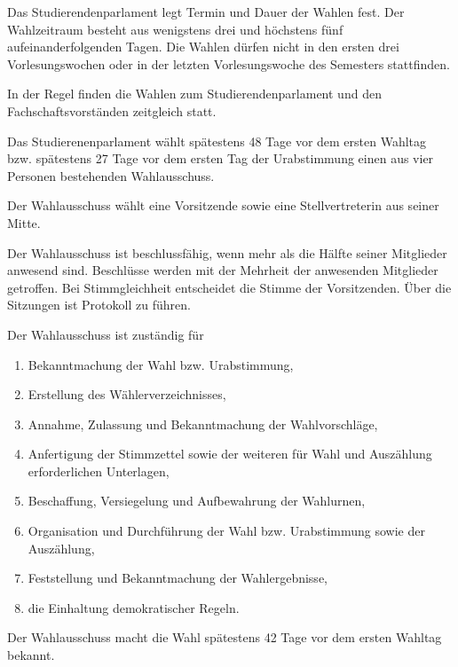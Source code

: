 Das Studierendenparlament legt Termin und Dauer der Wahlen fest. Der Wahlzeitraum besteht aus wenigstens drei und höchstens fünf aufeinanderfolgenden Tagen. Die Wahlen dürfen nicht in den ersten drei Vorlesungswochen oder in der letzten Vorlesungswoche des Semesters stattfinden. 

In der Regel finden die Wahlen zum Studierendenparlament und den Fachschaftsvorständen zeitgleich statt.

\label{wahl:wahlausschuss}
Das Studierenenparlament wählt spätestens 48 Tage vor dem ersten Wahltag bzw. spätestens 27 Tage vor dem ersten Tag der Urabstimmung einen aus vier Personen bestehenden Wahlausschuss. 

Der Wahlausschuss wählt eine Vorsitzende sowie eine Stellvertreterin aus seiner Mitte.

Der Wahlausschuss ist beschlussfähig, wenn mehr als die Hälfte seiner Mitglieder anwesend sind. Beschlüsse werden mit der Mehrheit der anwesenden Mitglieder getroffen. Bei Stimmgleichheit entscheidet die Stimme der Vorsitzenden. Über die Sitzungen ist Protokoll zu führen.

Der Wahlausschuss ist zuständig für
\begin{enumerate}
    \item Bekanntmachung der Wahl bzw. Urabstimmung,
    \item Erstellung des Wählerverzeichnisses,
    \item Annahme, Zulassung und Bekanntmachung der Wahlvorschläge,
    \item Anfertigung der Stimmzettel sowie der weiteren für Wahl und Auszählung erforderlichen Unterlagen,
    \item Beschaffung, Versiegelung und Aufbewahrung der Wahlurnen,
    \item Organisation und Durchführung der Wahl bzw. Urabstimmung sowie der Auszählung,
    \item Feststellung und Bekanntmachung der Wahlergebnisse,
    \item die Einhaltung demokratischer Regeln.
\end{enumerate}

\label{wahl:bekanntmachung-wahl}
Der Wahlausschuss macht die Wahl spätestens 42 Tage vor dem ersten Wahltag bekannt.

